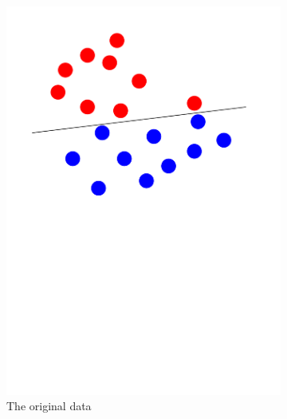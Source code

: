 \begin{figure}[h!] 
	\centering
	\begin{subfigure}{.4\textwidth}
		\includegraphics[width=\textwidth]{original}
		\caption{The original data}
		\label{fig:original}
	\end{subfigure}
	\begin{subfigure}{.4\textwidth}

\end{subfigure}
\end{figure}
